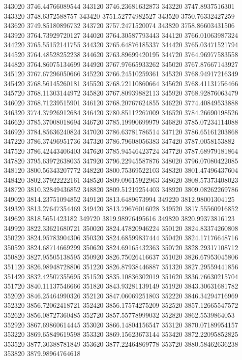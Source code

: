 {343020 3746.44766089544
343120 3746.23681632873
343220 3747.8937516301
343320 3748.6372588757
343420 3751.52774982527
343520 3750.76332427259
343620 3749.85180896732
343720 3757.2471520074
343820 3758.86603431506
343920 3764.73929720127
344020 3764.30587793443
344120 3766.01063987324
344220 3765.55152141755
344320 3765.64876185337
344420 3765.03471521794
344520 3764.48528252238
344620 3763.89699420195
344720 3764.96977583558
344820 3764.86075134699
344920 3767.97665933262
345020 3767.87667143927
345120 3767.67296050666
345220 3766.24510259361
345320 3768.94917216349
345420 3768.56145260181
345520 3768.72110860664
345620 3768.41131756466
345720 3768.11303144972
345820 3767.80939882113
345920 3768.92876063479
346020 3768.71239515901
346120 3768.20767624855
346220 3774.40849533888
346320 3774.37926912684
346420 3780.85112267009
346520 3784.26690198526
346620 3785.37008018694
346720 3785.19990699979
346820 3785.07234114088
346920 3784.85636240824
347020 3786.63781786514
347120 3786.65161203868
347220 3786.37496951736
347320 3786.79608056383
347420 3787.0058153882
347520 3786.42443406403
347620 3785.94546423724
347720 3787.68979181864
347820 3795.63972638035
347920 3796.22945587876
348020 3796.07080422085
348120 3800.56343207772
348220 3800.75369522103
348320 3801.47496437604
348420 3802.37922222161
348520 3809.09615922963
348620 3808.57373408023
348720 3810.32849436852
348820 3809.51219254403
348920 3809.08262269786
349020 3814.23751094852
349120 3813.6489673994
349220 3812.98001304125
349320 3813.27647354469
349420 3813.79676016028
349520 3817.55560916852
349620 3818.5651423182
349720 3819.98976495616
349820 3820.99373816123
349920 3822.33621680721
350020 3824.47820946224
350120 3824.83374260808
350220 3824.95783904306
350320 3824.68599837444
350420 3824.17176648716
350520 3824.68714669299
350620 3824.69165432363
350720 3828.29317108712
350820 3827.95505138595
350920 3826.75026416637
351020 3826.67953045806
351120 3826.98948728806
351220 3826.87938446887
351320 3827.29559441856
351420 3832.42507355695
351520 3835.10836302019
351620 3836.76630215704
351720 3840.11137546666
351820 3843.93281139149
351920 3843.30631681782
352020 3846.25464990326
352120 3847.06069251803
352220 3846.34294716969
352320 3856.72062418721
352420 3856.17574275209
352520 3857.12665547572
352620 3856.08727360485
352720 3857.55778999032
352820 3862.5539864053
352920 3867.69860614445
353020 3866.14804156547
353120 3870.07189954157
353220 3869.65849619598
353320 3869.15623673144
353420 3872.22095852825
353520 3877.30388781849
353620 3877.22464869778
353720 3880.58462636238
353820 3879.98964764618
}
